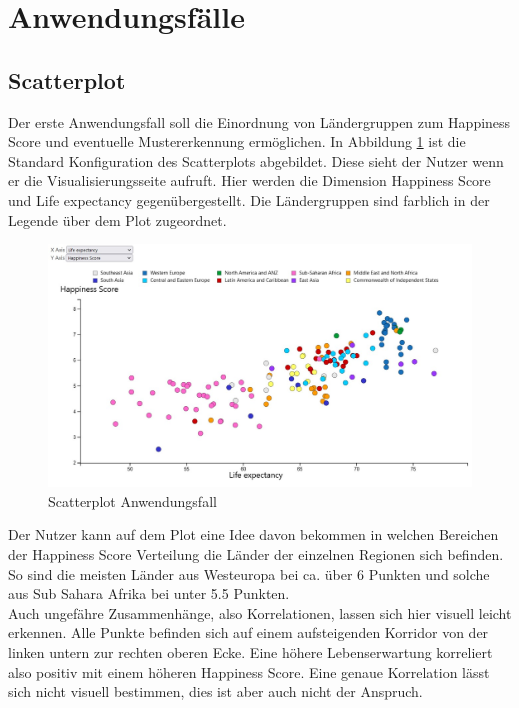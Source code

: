 \section{Anwendungsfälle}

\subsection{Scatterplot}

Der erste Anwendungsfall soll die Einordnung von Ländergruppen zum Happiness Score und eventuelle Mustererkennung ermöglichen. In Abbildung \ref{fig:scatterplot_anw} ist die Standard Konfiguration des Scatterplots abgebildet. Diese sieht der Nutzer wenn er die Visualisierungsseite aufruft. Hier werden die Dimension Happiness Score und Life expectancy gegenübergestellt. Die Ländergruppen sind farblich in der Legende über dem Plot zugeordnet.\\

\begin{figure}[h]
 \centering
 \includegraphics[width = \textwidth]{img/scatterplot_anw.jpg}
 \caption{Scatterplot Anwendungsfall}
 \label{fig:scatterplot_anw}
\end{figure}

Der Nutzer kann auf dem Plot eine Idee davon bekommen in welchen Bereichen der Happiness Score Verteilung die Länder der einzelnen Regionen sich befinden. So sind die meisten Länder aus Westeuropa bei ca. über 6 Punkten und solche aus Sub Sahara Afrika bei unter 5.5 Punkten. \\

Auch ungefähre Zusammenhänge, also Korrelationen, lassen sich hier visuell leicht erkennen. Alle Punkte befinden sich auf einem aufsteigenden Korridor von der linken untern zur rechten oberen Ecke. Eine höhere Lebenserwartung korreliert also positiv mit einem höheren Happiness Score. Eine genaue Korrelation lässt sich nicht visuell bestimmen, dies ist aber auch nicht der Anspruch. \\


